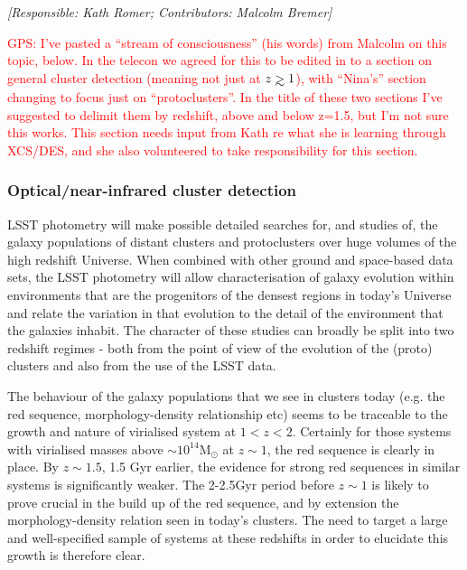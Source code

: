 \documentclass[a4paper,11pt]{article}
\newcommand{\red}{\textcolor{red}}
\def\gs{\mathrel{\hbox{\rlap{\hbox{\lower4pt\hbox{$\sim$}}}\hbox{$>$}}}}
\begin{document}
{\it [Responsible: Kath Romer; Contributors: Malcolm Bremer]}

\noindent\red{GPS: I've pasted a ``stream of consciousness'' (his
  words) from Malcolm on this topic, below.  In the telecon we agreed
  for this to be edited in to a section on general cluster detection
  (meaning not just at $z\gs1$), with ``Nina's'' section changing to
  focus just on ``protoclusters''.  In the title of these two sections
  I've suggested to delimit them by redshift, above and below z=1.5,
  but I'm not sure this works.  This section needs input from Kath re
  what she is learning through XCS/DES, and she also volunteered to
  take responsibility for this section.}

\subsubsection*{Optical/near-infrared cluster detection}

\noindent LSST photometry will make possible detailed searches for,
and studies of, the galaxy populations of distant clusters and
protoclusters over huge volumes of the high redshift Universe. When
combined with other ground and space-based data sets, the LSST
photometry will allow characterisation of galaxy evolution within
environments that are the progenitors of the densest regions in
today's Universe and relate the variation in that evolution to the
detail of the environment that the galaxies inhabit. The character of
these studies can broadly be split into two redshift regimes - both
from the point of view of the evolution of the (proto) clusters and
also from the use of the LSST data.

The behaviour of the galaxy populations that we see in clusters today
(e.g. the red sequence, morphology-density relationship etc) seems to
be traceable to the growth and nature of virialised system at
$1<z<2$. Certainly for those systems with virialised masses above
$\sim 10^{14}$M$_\odot$ at $z\sim 1$, the red sequence is clearly in
place. By $z\sim 1.5$, 1.5 Gyr earlier, the evidence for strong red
sequences in similar systems is significantly weaker. The 2-2.5Gyr
period before $z\sim 1$ is likely to prove crucial in the build up of
the red sequence, and by extension the morphology-density relation
seen in today's clusters. The need to target a large and
well-specified sample of systems at these redshifts in order to
elucidate this growth is therefore clear.
\end{document}
